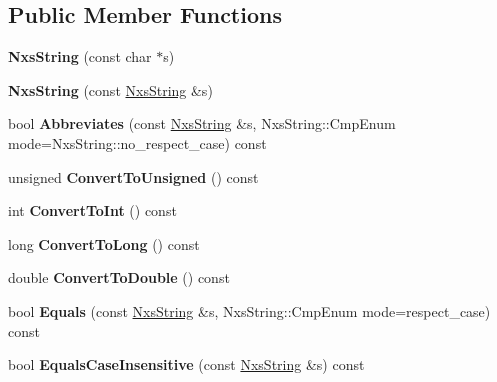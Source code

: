 \subsection*{Public Member Functions}
\begin{DoxyCompactItemize}
\item 
\hypertarget{classNxsString_abcd673658cc53d7029dd7196deb65719}{
{\bfseries NxsString} (const char $\ast$s)}
\label{classNxsString_abcd673658cc53d7029dd7196deb65719}

\item 
\hypertarget{classNxsString_a1cea39f14ea5ad1d0a28c6d596003b48}{
{\bfseries NxsString} (const \hyperlink{classNxsString}{NxsString} \&s)}
\label{classNxsString_a1cea39f14ea5ad1d0a28c6d596003b48}

\item 
\hypertarget{classNxsString_af5a5447a725d0772c2a4fb913cc0674c}{
bool {\bfseries Abbreviates} (const \hyperlink{classNxsString}{NxsString} \&s, NxsString::CmpEnum mode=NxsString::no\_\-respect\_\-case) const }
\label{classNxsString_af5a5447a725d0772c2a4fb913cc0674c}

\item 
\hypertarget{classNxsString_af86c992b7d613025ba4ec14bef4e923a}{
unsigned {\bfseries ConvertToUnsigned} () const }
\label{classNxsString_af86c992b7d613025ba4ec14bef4e923a}

\item 
\hypertarget{classNxsString_a195f32f9024ec445e9af4a98d6e1431a}{
int {\bfseries ConvertToInt} () const }
\label{classNxsString_a195f32f9024ec445e9af4a98d6e1431a}

\item 
\hypertarget{classNxsString_a37cb990a4d48d86a2c650cf49f5a7533}{
long {\bfseries ConvertToLong} () const }
\label{classNxsString_a37cb990a4d48d86a2c650cf49f5a7533}

\item 
\hypertarget{classNxsString_ab0ba8827ba9778ace41c65e5c4908471}{
double {\bfseries ConvertToDouble} () const }
\label{classNxsString_ab0ba8827ba9778ace41c65e5c4908471}

\item 
\hypertarget{classNxsString_abd881b99ee0b2a2d9af22ff07fd7a746}{
bool {\bfseries Equals} (const \hyperlink{classNxsString}{NxsString} \&s, NxsString::CmpEnum mode=respect\_\-case) const }
\label{classNxsString_abd881b99ee0b2a2d9af22ff07fd7a746}

\item 
\hypertarget{classNxsString_a1c9d6018f25dd43b0e6795afa25cadd8}{
bool {\bfseries EqualsCaseInsensitive} (const \hyperlink{classNxsString}{NxsString} \&s) const }
\label{classNxsString_a1c9d6018f25dd43b0e6795afa25cadd8}


\end{DoxyCompactItemize}
